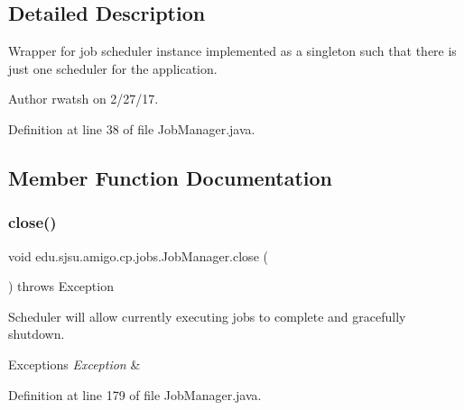 \subsection{Detailed Description}
Wrapper for job scheduler instance implemented as a singleton such that there is just one scheduler for the application.

\begin{DoxyAuthor}{Author}
rwatsh on 2/27/17. 
\end{DoxyAuthor}


Definition at line 38 of file Job\+Manager.\+java.



\subsection{Member Function Documentation}
\mbox{\label{classedu_1_1sjsu_1_1amigo_1_1cp_1_1jobs_1_1_job_manager_ac4c20f7bb76c26a3c97827283ef1213b}} 
\subsubsection{\texorpdfstring{close()}{close()}}
{\footnotesize\ttfamily void edu.\+sjsu.\+amigo.\+cp.\+jobs.\+Job\+Manager.\+close (\begin{DoxyParamCaption}{ }\end{DoxyParamCaption}) throws Exception}

Scheduler will allow currently executing jobs to complete and gracefully shutdown.


\begin{DoxyExceptions}{Exceptions}
{\em Exception} & \\
\hline
\end{DoxyExceptions}


Definition at line 179 of file Job\+Manager.\+java.

\mbox{\label{classedu_1_1sjsu_1_1amigo_1_1cp_1_1jobs_1_1_job_manager_a9ed144bf27bd9eced89baa08d72d8911}} 
